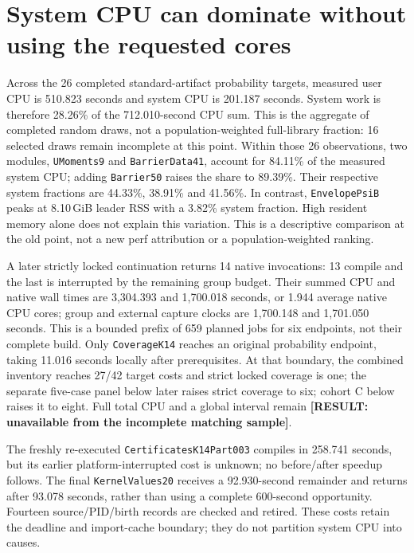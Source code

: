 \documentclass[10pt,twocolumn]{article}
\newcommand{\missing}[1]{\textbf{[RESULT: #1]}}
\begin{document}
\section{System CPU can dominate without using the requested cores}
\label{sec:system}
Across the 26 completed standard-artifact probability targets, measured
user CPU is 510.823 seconds and system CPU is 201.187 seconds.
System work is therefore 28.26\% of the 712.010-second CPU sum.
This is the aggregate of completed random draws, not a population-weighted
full-library fraction: 16 selected draws remain incomplete at this point.
Within those 26 observations, two modules, \texttt{UMoments9} and
\texttt{BarrierData41}, account for 84.11\% of the measured system CPU;
adding \texttt{Barrier50} raises the share to 89.39\%.
Their respective system fractions are 44.33\%, 38.91\% and 41.56\%.
In contrast, \texttt{EnvelopePsiB} peaks at 8.10\,GiB leader RSS with a
3.82\% system fraction. High resident memory alone does not explain
this variation. This is a descriptive comparison at the old point, not a
new perf attribution or a population-weighted ranking.

A later strictly locked continuation returns 14 native invocations:
13 compile and the last is interrupted by the remaining group budget.
Their summed CPU and native wall times are 3,304.393 and 1,700.018 seconds,
or 1.944 average native CPU cores; group and external capture clocks are
1,700.148 and 1,701.050 seconds. This is a bounded prefix of 659 planned
jobs for six endpoints, not their complete build.
Only \texttt{CoverageK14} reaches an original probability endpoint,
taking 11.016 seconds locally after prerequisites.
At that boundary, the combined inventory reaches 27/42 target costs
and strict locked coverage is one; the separate five-case panel below
later raises strict coverage to six; cohort C below raises it to eight.
Full total CPU and a global interval remain
\missing{unavailable from the incomplete matching sample}.

The freshly re-executed \texttt{CertificatesK14Part003} compiles in
258.741 seconds, but its earlier platform-interrupted cost is unknown;
no before/after speedup follows.
The final \texttt{KernelValues20} receives a 92.930-second remainder and
returns after 93.078 seconds, rather than using a complete 600-second
opportunity. Fourteen source/PID/birth records are checked and retired.
These costs retain the deadline and import-cache boundary; they do not
partition system CPU into causes.
\end{document}
